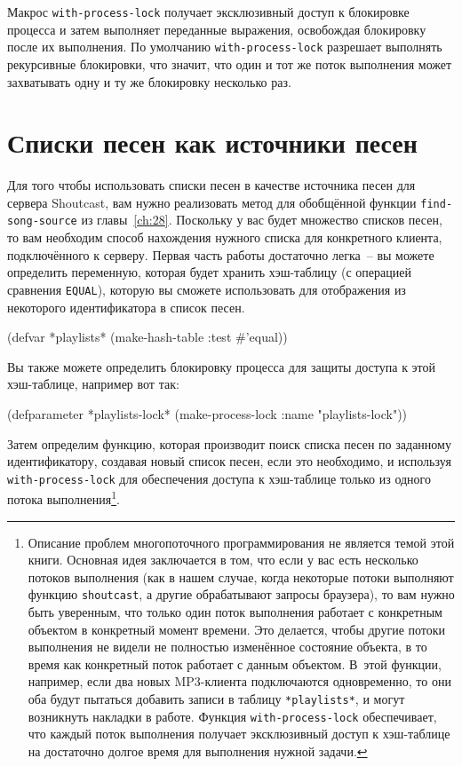 Макрос \lstinline{with-process-lock} получает эксклюзивный доступ к блокировке процесса и
затем выполняет переданные выражения, освобождая блокировку после их выполнения.  По
умолчанию \lstinline{with-process-lock} разрешает выполнять рекурсивные блокировки, что
значит, что один и тот же поток выполнения может захватывать одну и ту же блокировку
несколько раз.

\section{Списки песен как источники песен}

Для того чтобы использовать списки песен в качестве источника песен для сервера
Shoutcast, вам нужно реализовать метод для обобщённой функции \lstinline{find-song-source} из
главы~\ref{ch:28}.  Поскольку у вас будет множество списков песен, то вам необходим способ
нахождения нужного списка для конкретного клиента, подключённого к серверу.  Первая часть
работы достаточно легка~-- вы можете определить переменную, которая будет хранить
хэш-таблицу (с операцией сравнения \lstinline{EQUAL}), которую вы сможете использовать для
отображения из некоторого идентификатора в список песен.

\begin{myverb}
(defvar *playlists* (make-hash-table :test #'equal))
\end{myverb}

Вы также можете определить блокировку процесса для защиты доступа к этой хэш-таблице,
например вот так:

\begin{myverb}
(defparameter *playlists-lock* (make-process-lock :name "playlists-lock"))
\end{myverb}

Затем определим функцию, которая производит поиск списка песен по заданному
идентификатору, создавая новый список песен, если это необходимо, и используя
\lstinline{with-process-lock} для обеспечения доступа к хэш-таблице только из одного потока
выполнения\footnote{Описание проблем многопоточного программирования не является темой
  этой книги. Основная идея заключается в том, что если у вас есть несколько потоков
  выполнения (как в нашем случае, когда некоторые потоки выполняют функцию
  \lstinline{shoutcast}, а другие обрабатывают запросы браузера), то вам нужно быть уверенным,
  что только один поток выполнения работает с конкретным объектом в конкретный момент
  времени.  Это делается, чтобы другие потоки выполнения не видели не полностью изменённое
  состояние объекта, в то время как конкретный поток работает с данным объектом.  В~этой
  функции, например, если два новых MP3-клиента подключаются одновременно, то они оба
  будут пытаться добавить записи в таблицу \lstinline{*playlists*}, и могут возникнуть накладки
  в работе.  Функция \lstinline{with-process-lock} обеспечивает, что каждый поток выполнения
  получает эксклюзивный доступ к хэш-таблице на достаточно долгое время для выполнения
  нужной задачи.}.


